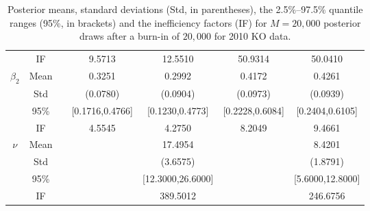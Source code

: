 \begin{table}
\begin{footnotesize}
\begin{singlespace}
\begin{tabular}{ccc cccc }
 & IF  &  &  9.5713  &  12.5510  &  50.9314  &  50.0410  \\ [1.0ex] 
 $\beta_2$   & Mean   &  &  0.3251  &  0.2992  &  0.4172  &  0.4261  \\  
 & Std   &  &  (0.0780)  &  (0.0904)  &  (0.0973)  &  (0.0939)  \\  
 & 95\%  &  &  [0.1716,0.4766]  &  [0.1230,0.4773]  &  [0.2228,0.6084]  &  [0.2404,0.6105]  \\  
 & IF  &  &  4.5545  &  4.2750  &  8.2049  &  9.4661  \\ [1.0ex] 
 $\nu$   & Mean   &  &     &  17.4954  &    &  8.4201  \\  
 & Std   &  &   &  (3.6575)  &    &  (1.8791)  \\  
 & 95\%  &  &    &  [12.3000,26.6000]  &    &  [5.6000,12.8000]  \\  
 & IF  &  &    &  389.5012  &   &  246.6756  \\ [1.0ex] 
\bottomrule 
\end{tabular}
\end{singlespace}
\end{footnotesize}
 \caption{Posterior means, standard deviations (Std, in parentheses), 
the 2.5\%--97.5\% quantile ranges (95\%, in brackets) and  the inefficiency factors (IF)  for $M=20,000$ posterior draws after a burn-in of $20,000$ 
for 2010 KO data.}
\label{tab:sim_res_2010_KO} 
\end{table}
